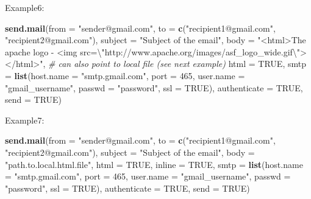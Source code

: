 \documentclass[]{book}
\newenvironment{Shaded}{\begin{snugshade}}{\end{snugshade}}
\newcommand{\KeywordTok}[1]{\textcolor[rgb]{0.13,0.29,0.53}{\textbf{#1}}}
\newcommand{\DataTypeTok}[1]{\textcolor[rgb]{0.13,0.29,0.53}{#1}}
\newcommand{\DecValTok}[1]{\textcolor[rgb]{0.00,0.00,0.81}{#1}}
\newcommand{\CharTok}[1]{\textcolor[rgb]{0.31,0.60,0.02}{#1}}
\newcommand{\StringTok}[1]{\textcolor[rgb]{0.31,0.60,0.02}{#1}}
\newcommand{\CommentTok}[1]{\textcolor[rgb]{0.56,0.35,0.01}{\textit{#1}}}
\newcommand{\OtherTok}[1]{\textcolor[rgb]{0.56,0.35,0.01}{#1}}
\newcommand{\NormalTok}[1]{#1}
\begin{document}
Example6:

\begin{Shaded}
\begin{Highlighting}[]
\KeywordTok{send.mail}\NormalTok{(}\DataTypeTok{from =} \StringTok{"sender@gmail.com"}\NormalTok{,}
          \DataTypeTok{to =} \KeywordTok{c}\NormalTok{(}\StringTok{"recipient1@gmail.com"}\NormalTok{, }\StringTok{"recipient2@gmail.com"}\NormalTok{),}
          \DataTypeTok{subject =} \StringTok{"Subject of the email"}\NormalTok{,}
          \DataTypeTok{body =} \StringTok{"<html>The apache logo - <img src=}\CharTok{\textbackslash{}"}\StringTok{http://www.apache.org/images/asf_logo_wide.gif}\CharTok{\textbackslash{}"}\StringTok{></html>"}\NormalTok{, }\CommentTok{# can also point to local file (see next example)}
          \DataTypeTok{html =} \OtherTok{TRUE}\NormalTok{,}
          \DataTypeTok{smtp =} \KeywordTok{list}\NormalTok{(}\DataTypeTok{host.name =} \StringTok{"smtp.gmail.com"}\NormalTok{, }\DataTypeTok{port =} \DecValTok{465}\NormalTok{, }\DataTypeTok{user.name =} \StringTok{"gmail_username"}\NormalTok{, }\DataTypeTok{passwd =} \StringTok{"password"}\NormalTok{, }\DataTypeTok{ssl =} \OtherTok{TRUE}\NormalTok{),}
          \DataTypeTok{authenticate =} \OtherTok{TRUE}\NormalTok{,}
          \DataTypeTok{send =} \OtherTok{TRUE}\NormalTok{)}
\end{Highlighting}
\end{Shaded}

Example7:

\begin{Shaded}
\begin{Highlighting}[]
\KeywordTok{send.mail}\NormalTok{(}\DataTypeTok{from =} \StringTok{"sender@gmail.com"}\NormalTok{,}
          \DataTypeTok{to =} \KeywordTok{c}\NormalTok{(}\StringTok{"recipient1@gmail.com"}\NormalTok{, }\StringTok{"recipient2@gmail.com"}\NormalTok{),}
          \DataTypeTok{subject =} \StringTok{"Subject of the email"}\NormalTok{,}
          \DataTypeTok{body =} \StringTok{"path.to.local.html.file"}\NormalTok{,}
          \DataTypeTok{html =} \OtherTok{TRUE}\NormalTok{,}
          \DataTypeTok{inline =} \OtherTok{TRUE}\NormalTok{,}
          \DataTypeTok{smtp =} \KeywordTok{list}\NormalTok{(}\DataTypeTok{host.name =} \StringTok{"smtp.gmail.com"}\NormalTok{, }\DataTypeTok{port =} \DecValTok{465}\NormalTok{, }\DataTypeTok{user.name =} \StringTok{"gmail_username"}\NormalTok{, }\DataTypeTok{passwd =} \StringTok{"password"}\NormalTok{, }\DataTypeTok{ssl =} \OtherTok{TRUE}\NormalTok{),}
          \DataTypeTok{authenticate =} \OtherTok{TRUE}\NormalTok{,}
          \DataTypeTok{send =} \OtherTok{TRUE}\NormalTok{)}
\end{Highlighting}
\end{Shaded}
\end{document}
